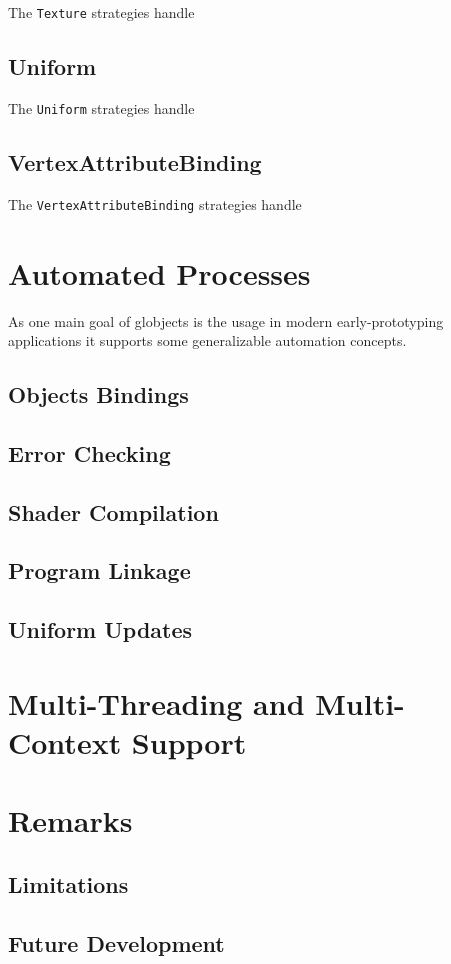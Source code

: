 \documentclass{article}
\begin{document}
The \verb|Texture| strategies handle

\subsection{Uniform}

The \verb|Uniform| strategies handle

\subsection{VertexAttributeBinding}

The \verb|VertexAttributeBinding| strategies handle

\section{Automated Processes}

As one main goal of globjects is the usage in modern early-prototyping applications it supports some generalizable automation concepts.

\subsection{Objects Bindings}



\subsection{Error Checking}



\subsection{Shader Compilation}

 

\subsection{Program Linkage}



\subsection{Uniform Updates}



\section{Multi-Threading and Multi-Context Support}


\section{Remarks}

\subsection{Limitations}

\subsection{Future Development}
\end{document}
